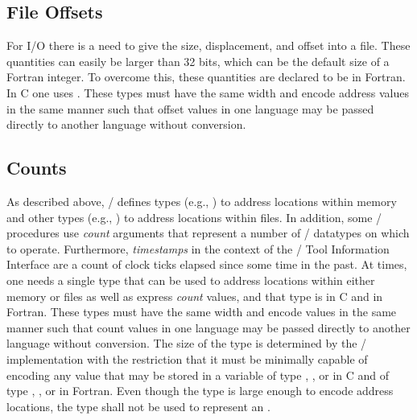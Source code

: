 \subsection{File Offsets}

For I/O there is a need to give the size, displacement, and offset
into a file.  These quantities can easily be larger than 32 bits, which
can be the default size of a Fortran integer.  To overcome this, these
quantities are declared to be
 in
Fortran.
In C one uses .
These types must have the same width and encode
address values in the same manner such that offset values in one
language may be passed directly to another language without
conversion.

\subsection{Counts}
\label{subsec:count}

As described above, \MPI/ defines types (e.g., ) to
address locations within memory and other types
(e.g., ) to address locations within files.  In
addition, some \MPI/ procedures use \emph{count} arguments that
represent a number of \MPI/ datatypes on which to operate. Furthermore,
\emph{timestamps} in the context of the \MPI/ Tool Information Interface are
a count of clock ticks elapsed since some time in the past. At times,
one needs a single type that can be used to address locations within
either memory or files as well as express \emph{count} values, and that
type is  in C and
in Fortran. These types
must have the same width and encode values in the same manner such
that count values in one language may be passed directly to another
language without conversion.
The size of the  type is determined by the
\MPI/ implementation with the restriction that it must be minimally
capable of encoding any value that may be stored in a variable of type
, , or  in C and of type
, , or
 in Fortran.
Even though the  type is large enough to encode address
locations, the  type shall not be used to represent an
.

